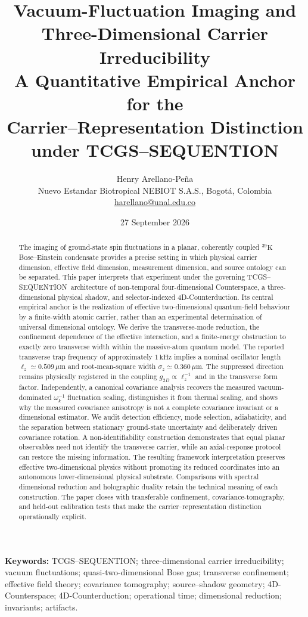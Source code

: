 \documentclass[11pt,a4paper]{article}
\title{Vacuum-Fluctuation Imaging and\\
Three-Dimensional Carrier Irreducibility\\[0.6em]
\large A Quantitative Empirical Anchor for the\\
Carrier--Representation Distinction under TCGS--SEQUENTION}
\author{Henry Arellano-Pe\~na\\\small Nuevo Estandar Biotropical NEBIOT S.A.S., Bogot\'a, Colombia\\\small\href{mailto:harellano@unal.edu.co}{harellano@unal.edu.co}}
\date{27 September 2026}
\theoremstyle{definition}
\theoremstyle{remark}
\newcommand{\TCGS}{TCGS--SEQUENTION}
\newcommand{\lop}{\ell_z}
\begin{document}
\maketitle
\begin{abstract}
The imaging of ground-state spin fluctuations in a planar, coherently coupled $^{39}\mathrm K$ Bose--Einstein condensate provides a precise setting in which physical carrier dimension, effective field dimension, measurement dimension, and source ontology can be separated. This paper interprets that experiment under the governing \TCGS\ architecture of non-temporal four-dimensional Counterspace, a three-dimensional physical shadow, and selector-indexed 4D-Counterduction. Its central empirical anchor is the realization of effective two-dimensional quantum-field behaviour by a finite-width atomic carrier, rather than an experimental determination of universal dimensional ontology. We derive the transverse-mode reduction, the confinement dependence of the effective interaction, and a finite-energy obstruction to exactly zero transverse width within the massive-atom quantum model. The reported transverse trap frequency of approximately $1\,\mathrm{kHz}$ implies a nominal oscillator length $\lop\simeq0.509\,\mu\mathrm m$ and root-mean-square width $\sigma_z\simeq0.360\,\mu\mathrm m$. The suppressed direction remains physically registered in the coupling $g_{2D}\propto\lop^{-1}$ and in the transverse form factor. Independently, a canonical covariance analysis recovers the measured vacuum-dominated $\omega_k^{-1}$ fluctuation scaling, distinguishes it from thermal scaling, and shows why the measured covariance anisotropy is not a complete covariance invariant or a dimensional estimator. We audit detection efficiency, mode selection, adiabaticity, and the separation between stationary ground-state uncertainty and deliberately driven covariance rotation. A non-identifiability construction demonstrates that equal planar observables need not identify the transverse carrier, while an axial-response protocol can restore the missing information. The resulting framework interpretation preserves effective two-dimensional physics without promoting its reduced coordinates into an autonomous lower-dimensional physical substrate. Comparisons with spectral dimensional reduction and holographic duality retain the technical meaning of each construction. The paper closes with transferable confinement, covariance-tomography, and held-out calibration tests that make the carrier--representation distinction operationally explicit.
\end{abstract}
\noindent\textbf{Keywords:} \TCGS; three-dimensional carrier irreducibility; vacuum fluctuations; quasi-two-dimensional Bose gas; transverse confinement; effective field theory; covariance tomography; source--shadow geometry; 4D-Counterspace; 4D-Counterduction; operational time; dimensional reduction; invariants; artifacts.
\end{document}
